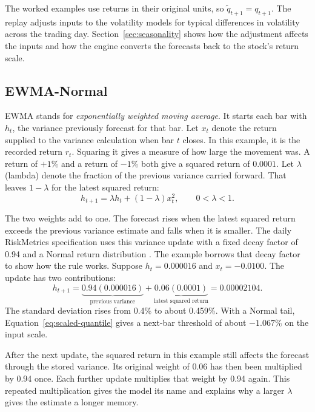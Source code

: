 \documentclass[
	12pt,				%
	openright,			%
	twoside,			%
	a4paper,
	chapter=TITLE,
	english				%
	]{abntex2}
\begin{document}
The worked examples use returns in their original units, so $\widetilde q_{t+1}=q_{t+1}$. The replay adjusts inputs to the volatility models for typical differences in volatility across the trading day. Section~\ref{sec:seasonality} shows how the adjustment affects the inputs and how the engine converts the forecasts back to the stock's return scale.

\subsection{EWMA-Normal}

EWMA stands for \emph{exponentially weighted moving average}. It starts each bar with $h_t$, the variance previously forecast for that bar. Let $x_t$ denote the return supplied to the variance calculation when bar $t$ closes. In this example, it is the recorded return $r_t$. Squaring it gives a measure of how large the movement was. A return of $+1\%$ and a return of $-1\%$ both give a squared return of $0.0001$. Let $\lambda$ (lambda) denote the fraction of the previous variance carried forward. That leaves $1-\lambda$ for the latest squared return:
\begin{equation}
  h_{t+1}=\lambda h_t+(1-\lambda)x_t^2,\qquad 0<\lambda<1.
  \label{eq:ewma}
\end{equation}

The two weights add to one. The forecast rises when the latest squared return exceeds the previous variance estimate and falls when it is smaller. The daily RiskMetrics specification uses this variance update with a fixed decay factor of 0.94 and a Normal return distribution \cite{riskmetrics-1996}. The example borrows that decay factor to show how the rule works. Suppose $h_t=0.000016$ and $x_t=-0.0100$. The update has two contributions:
\begin{equation*}
  h_{t+1}=\underbrace{0.94(0.000016)}_{\text{previous variance}}
           +\underbrace{0.06(0.0001)}_{\text{latest squared return}}
           =0.00002104.
\end{equation*}
The standard deviation rises from 0.4\% to about 0.459\%. With a Normal tail, Equation~\ref{eq:scaled-quantile} gives a next-bar threshold of about $-1.067\%$ on the input scale.

After the next update, the squared return in this example still affects the forecast through the stored variance. Its original weight of 0.06 has then been multiplied by 0.94 once. Each further update multiplies that weight by 0.94 again. This repeated multiplication gives the model its name and explains why a larger $\lambda$ gives the estimate a longer memory.
\end{document}
